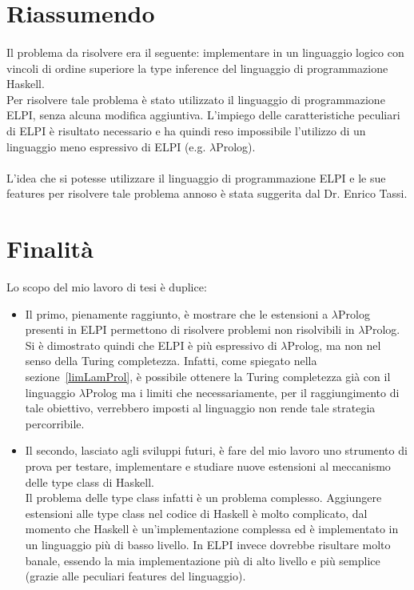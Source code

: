 \documentclass[12pt,a4paper,openright,twoside]{report}
\begin{document}

\section{Riassumendo}

\paragraph{}
Il problema da risolvere era il seguente: implementare in un linguaggio logico con vincoli di ordine superiore la type inference del linguaggio di programmazione Haskell.\\
Per risolvere tale problema è stato utilizzato il linguaggio di programmazione ELPI, senza alcuna modifica aggiuntiva. L'impiego delle caratteristiche peculiari di ELPI è risultato necessario e ha quindi reso impossibile l'utilizzo di un linguaggio meno espressivo di ELPI (e.g. $\lambda$Prolog).

\paragraph{}
L'idea che si potesse utilizzare il linguaggio di programmazione ELPI e le sue features per risolvere tale problema annoso è stata suggerita dal Dr. Enrico Tassi.

\section{Finalità}
Lo scopo del mio lavoro di tesi è duplice:
\begin{itemize}
 \item Il primo, pienamente raggiunto, è mostrare che le estensioni a $\lambda$Prolog presenti in ELPI permettono di risolvere problemi non risolvibili in $\lambda$Prolog.\\
 Si è dimostrato quindi che ELPI è più espressivo di $\lambda$Prolog, ma non nel senso della Turing completezza. Infatti, come spiegato nella sezione~\ref{limLamProl}, è possibile ottenere la Turing completezza già con il linguaggio $\lambda$Prolog ma i limiti che necessariamente, per il raggiungimento di tale obiettivo, verrebbero imposti al linguaggio non rende tale strategia percorribile.
 \item Il secondo, lasciato agli sviluppi futuri, è fare del mio lavoro uno strumento di prova per testare, implementare e studiare nuove estensioni al meccanismo delle type class di Haskell.\\
 Il problema delle type class infatti è un problema complesso. Aggiungere estensioni alle type class nel codice di Haskell è molto complicato, dal momento che Haskell è un'implementazione complessa ed è implementato in un linguaggio più di basso livello. In ELPI invece dovrebbe risultare molto banale, essendo la mia implementazione più di alto livello e più semplice (grazie alle peculiari features del linguaggio).
\end{itemize}
\end{document}
